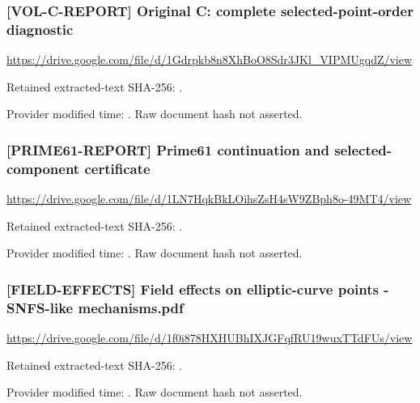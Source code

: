 \par\noindent\begin{minipage}{\linewidth}\small
\subsubsection*{[VOL-C-REPORT] Original C: complete selected-point-order diagnostic}\label{art:VOL-C-REPORT}
\url{https://drive.google.com/file/d/1Gdrpkb8n8XhBoO8Sdr3JKl_VIPMUgqdZ/view}
\par Retained extracted-text SHA-256: .
\par Provider modified time: . Raw document hash not asserted.
\end{minipage}\par\medskip

\par\noindent\begin{minipage}{\linewidth}\small
\subsubsection*{[PRIME61-REPORT] Prime61 continuation and selected-component certificate}\label{art:PRIME61-REPORT}
\url{https://drive.google.com/file/d/1LN7HqkBkLOihsZsH4sW9ZBph8o-49MT4/view}
\par Retained extracted-text SHA-256: .
\par Provider modified time: . Raw document hash not asserted.
\end{minipage}\par\medskip

\par\noindent\begin{minipage}{\linewidth}\small
\subsubsection*{[FIELD-EFFECTS] Field effects on elliptic-curve points - SNFS-like mechanisms.pdf}\label{art:FIELD-EFFECTS}
\url{https://drive.google.com/file/d/1f0i878HXHUBhIXJGFqfRU19wuxTTdFUs/view}
\par Retained extracted-text SHA-256: .
\par Provider modified time: . Raw document hash not asserted.
\end{minipage}\par\medskip

